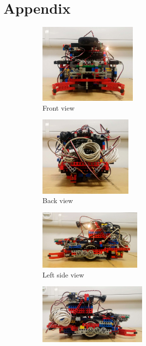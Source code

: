 \appendix

\section{Appendix}


\begin{figure}[ht]
    \centering
    \begin{subfigure}{0.4\textwidth}
        \includegraphics[width=\linewidth, height=4cm]{res/robot-pics/view-front.jpg}
        \caption{Front view}
    \end{subfigure}
    \begin{subfigure}{0.4\textwidth}
        \includegraphics[width=\linewidth, height=4cm]{res/robot-pics/view-back.jpg}
        \caption{Back view}
    \end{subfigure}
    \begin{subfigure}{0.4\textwidth}
        \includegraphics[width=\linewidth, height=3cm]{res/robot-pics/view-left-side.jpg}
        \caption{Left side view}
    \end{subfigure}
    \begin{subfigure}{0.4\textwidth}
        \includegraphics[width=\linewidth, height=3cm]{res/robot-pics/view-right-side.jpg}

\end{subfigure}
\end{figure}
